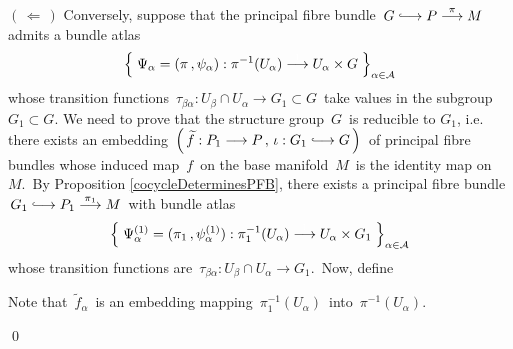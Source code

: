 \vskip 0.8cm
\noindent
\underline{$(\,\Longleftarrow\,)$}\;\;
Conversely, suppose that the principal fibre bundle
\,$G \longhookrightarrow P \overset{\pi}{\longrightarrow} M$\,
admits a bundle atlas
\begin{equation*}
\left\{\;\Psi_{\alpha} = (\pi\,,\psi_{\alpha}) : \pi^{-1}(U_{\alpha}) \overset{{\color{white}1}}{\longrightarrow} U_{\alpha} \times G\;\right\}_{\alpha\in\mathcal{A}}
\end{equation*}
whose transition functions
\,$\tau_{\beta\alpha} : U_{\beta} \cap U_{\alpha} \longrightarrow G_{1} \subset G$\,
take values in the subgroup $G_{1} \subset G$.
We need to prove that the structure group \,$G$\, is reducible to $G_{1}$, i.e. there exists an embedding
\,$\left(\,\widetilde{f} : P_{1} \longrightarrow P \,,\, \iota : G_{1} \longhookrightarrow G\,\right)$\,
of principal fibre bundles
whose induced map \,$f$\, on the base manifold \,$M$\, is the identity map on \,$M$.\,
By Proposition \ref{cocycleDeterminesPFB}, there exists a principal fibre bundle
\,$G_{1} \longhookrightarrow P_{1} \overset{\pi_{1}}{\longrightarrow} M$\,
with bundle atlas
\begin{equation*}
\left\{\;
	\Psi^{(1)}_{\alpha} = (\pi_{1}\,,\psi^{(1)}_{\alpha})
	: \pi_{1}^{-1}(U_{\alpha}) \overset{{\color{white}1}}{\longrightarrow} U_{\alpha} \times G_{1}
	\;\right\}_{\alpha\in\mathcal{A}}
\end{equation*}
whose transition functions are
\,$\tau_{\beta\alpha} : U_{\beta} \cap U_{\alpha} \longrightarrow G_{1}$.\,
Now, define
\begin{center}
\end{center}
Note that \,$\widetilde{f}_{\alpha}$\, is an embedding
mapping \,$\pi_{1}^{-1}(U_{\alpha})$\, into \,$\pi^{-1}(U_{\alpha})$.\,

\qed


